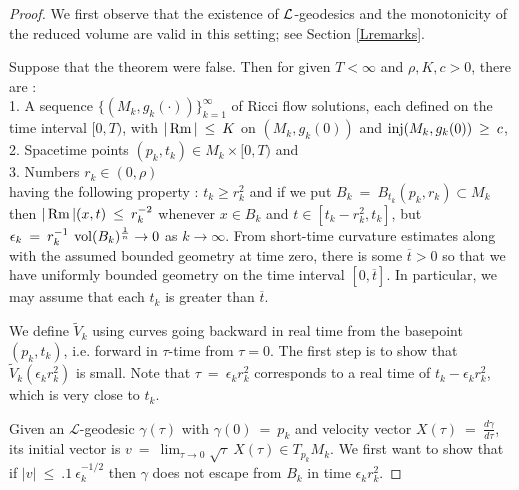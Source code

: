 \begin{proof}
We first observe that the existence of ${\mathcal L}$-geodesics and the
monotonicity of the reduced volume are valid in this setting; see Section \ref{Lremarks}.

Suppose that the theorem were false.  Then for given $T < \infty$
and $\rho, K, c > 0$, there are : \\
1. A sequence
$\{(M_k, g_k(\cdot))\}_{k=1}^\infty$ of Ricci flow solutions,
each defined on the
time interval $[0, T)$, with $|\operatorname{Rm}| \: \le \: K$ on $(M_k, g_k(0))$ and
$\operatorname{inj}(M_k, g_k(0)) \: \ge \: c$, \\
2. Spacetime points
$(p_k, t_k) \in M_k \times [0, T)$ and \\
3. Numbers $r_k \in (0, \rho)$ \\
having the following property :
$t_k \ge r_k^2$ and
if we put $B_k \: = \: B_{t_k}(p_k, r_k) \subset M_k$ then
$|\operatorname{Rm}|(x, t) \: \le \: r_k^{-2}$ whenever $x \in B_k$ and
$t \in [t_k - r_k^2, t_k]$, but
$\epsilon_k \: = \: r_k^{-1} \: \operatorname{vol}(B_k)^{\frac1n} \rightarrow 0$
as $k \rightarrow \infty$.
From short-time curvature estimates along with the assumed bounded geometry
at time zero, there is some $\overline{t} > 0$ so that
we have uniformly bounded geometry on the time interval
$[0, \overline{t}]$. In particular, we may assume that each
$t_k$ is greater than $\overline{t}$.

We define $\tilde{V}_k$ using curves
going backward in real time from the
basepoint $(p_k, t_k)$, i.e. forward in $\tau$-time from
$\tau = 0$.
The first step is to show that
$\tilde{V}_k(\epsilon_k r_k^2)$ is small. Note that
$\tau \:  = \: \epsilon_k r_k^2$ corresponds to a real time of
$t_k - \epsilon_k r_k^2$, which is very close to $t_k$.

Given an ${\mathcal L}$-geodesic $\gamma(\tau)$ with
$\gamma(0) \: = \: p_k$ and
velocity vector
$X(\tau) \: = \: \frac{d\gamma}{d\tau}$, its initial vector is
$v \: = \: \lim_{\tau \rightarrow 0} \sqrt{\tau} \: X(\tau)
\in T_{p_k} M_k$.
We first want
to show that if $|v| \: \le \: .1 \: \epsilon_k^{- 1/2}$ then
$\gamma$ does not escape from $B_k$ in time
$\epsilon_k r_k^2$.


\end{proof}
